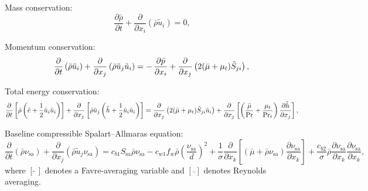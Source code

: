 \documentclass[10pt]{article}
\newcommand{\pp}[2]{\frac{\partial #1}{\partial #2}}
\newcommand{\sa}{\nu_{\mathrm{sa}}}
\begin{document}
Mass conservation:
\begin{equation}\label{eq:ns01}
\pp{\bar{\rho}}{t} + \pp{}{x_i} (\bar{\rho}\tilde{u}_i) = 0, 
\end{equation}

Momentum conservation:
\begin{equation}\label{eq:ns02}
\pp{}{t} \left(\bar{\rho} \tilde{u}_i \right) + \pp{}{x_j} \left(\bar{\rho} \tilde{u}_j \tilde{u}_i  \right) = - \, \pp{\bar{p}}{x_i} + \pp{}{x_j}\left( 2 (\bar{\mu} + \mu_t) \tilde{S}_{ji} \right), \\
\end{equation}

Total energy conservation:
\begin{equation}\label{eq:ns03}
\pp{}{t} \left[ \bar{\rho} \left( \tilde{e} + \frac{1}{2} \tilde{u}_i \tilde{u}_i \right) \right] + \pp{}{x_j} \left[ \bar{\rho} \tilde{u}_j \left( \tilde{h} + \frac{1}{2} \tilde{u}_i \tilde{u}_i \right) \right] =  \pp{}{x_j} \left( 2 (\bar{\mu} + \mu_t) \tilde{S}_{ji} \tilde{u}_i \right) + \pp{}{x_j} \left[ \left( \frac{\bar{\mu}}{\Pr} + \frac{\mu_t}{\Pr_t} \right) \pp{\tilde{h}}{x_j} \right], \\
\end{equation}

Baseline compressible Spalart--Allmaras equation:
\begin{equation}\label{eq:ns04}
\pp{}{t}(\bar{\rho} \sa) + \pp{}{x_j} (\bar{\rho} \tilde{u}_j \sa) =  c_{b1} S_{\mathrm{sa}} \bar{\rho} \sa - c_{w1} f_w \bar{\rho} \left( \frac{\sa}{d} \right)^2 + \frac{1}{\sigma} \pp{}{x_k} \left[ (\bar{\mu} + \bar{\rho} \sa) \pp{\sa}{x_k} \right] + \frac{c_{b2}}{\sigma} \bar{\rho} \pp{\sa}{x_k} \pp{\sa}{x_k},
\end{equation}
%
where $[\tilde{\,\,}]$ denotes a Favre-averaging variable and $[\bar{\,\,}]$ denotes Reynolds averaging.
\end{document}
